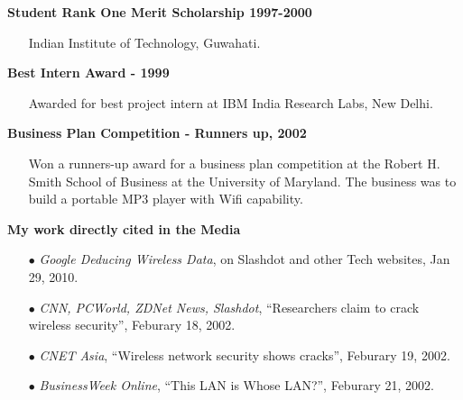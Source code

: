 \begin{resume}
{\bf Student Rank One Merit Scholarship 1997-2000}
    \begin{itemize}
         \item[] Indian Institute of Technology, Guwahati.
    \end{itemize}

{\bf Best Intern Award - 1999}
    \begin{itemize}
         \item[] Awarded for best project intern at IBM India Research Labs, New Delhi. 
    \end{itemize}

{\bf Business Plan Competition - Runners up, 2002}
    \begin{itemize}
         \item[] Won a runners-up award for a business plan competition at the
	 Robert H. Smith School of Business at the University of Maryland. The
	 business was to build a portable MP3 player with Wifi capability.
    \end{itemize}

{\bf My work directly cited in the Media}
    \begin{itemize}
         \item[$\bullet$] {\em Google Deducing Wireless Data}, on Slashdot and other Tech websites, Jan 29, 2010.
         \item[$\bullet$] {\em CNN, PCWorld, ZDNet News, Slashdot},  ``Researchers claim to crack
           wireless security'', Feburary 18, 2002.
         \item[$\bullet$] {\em CNET Asia}, ``Wireless network security shows cracks'', Feburary 19, 2002.  
         \item[$\bullet$] {\em BusinessWeek Online}, ``This LAN is Whose LAN?'', Feburary 21, 2002. 
    \end{itemize}


\end{resume}
